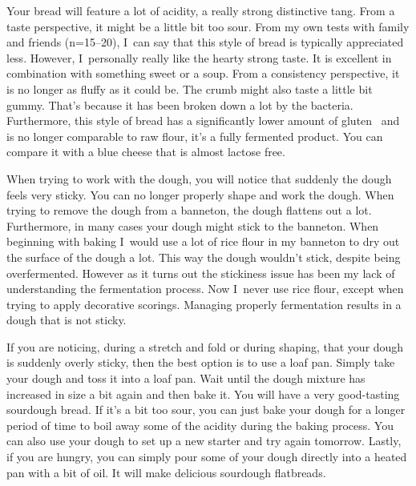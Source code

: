 Your bread will feature a lot of acidity, a really strong distinctive tang. From
a taste perspective, it might be a little bit too sour. From my own tests with family and
friends (n=15--20), I~can say that this style of bread is typically
appreciated less. However, I~personally really like the hearty strong taste.
It is excellent in combination with something
sweet or a soup.  From a consistency perspective, it is no longer as fluffy as it could be.
The crumb might also taste a little bit gummy. That's because it has been broken down a lot
by the bacteria. Furthermore, this style of bread has a significantly lower amount
of gluten~\cite{raffaella+di+cagno} and is no longer comparable to raw flour,
it's a fully fermented product.
You can compare it with a blue cheese that is almost lactose free.

When trying to work with the dough, you will notice that suddenly the dough feels
very sticky. You can no longer properly shape and work the dough. When trying to
remove the dough from a banneton, the dough flattens out a lot. Furthermore,
in many cases your dough might stick to the banneton. When beginning with baking
I~would use a lot of rice flour in my banneton to dry out the surface of the dough a lot.
This way the dough wouldn't stick, despite being overfermented. However as it
turns out the stickiness issue has been my lack of understanding the fermentation
process. Now I~never use rice flour, except when trying to apply decorative scorings.
Managing properly fermentation results in a dough that is not sticky.

If you are noticing, during a stretch and fold or during shaping, that your dough
is suddenly overly sticky, then the best option is to use a loaf pan. Simply take
your dough and toss it into a loaf pan. Wait until the dough mixture has increased
in size a bit again and then bake it. You will have a very good-tasting sourdough
bread. If it's a bit too sour, you can just bake your dough for a longer period
of time to boil away some of the acidity during the baking process. You can also use
your dough to set up a new starter and try again tomorrow. Lastly, if you are hungry,
you can simply pour some of your dough directly into a heated pan with a bit of
oil. It will make delicious sourdough flatbreads.

